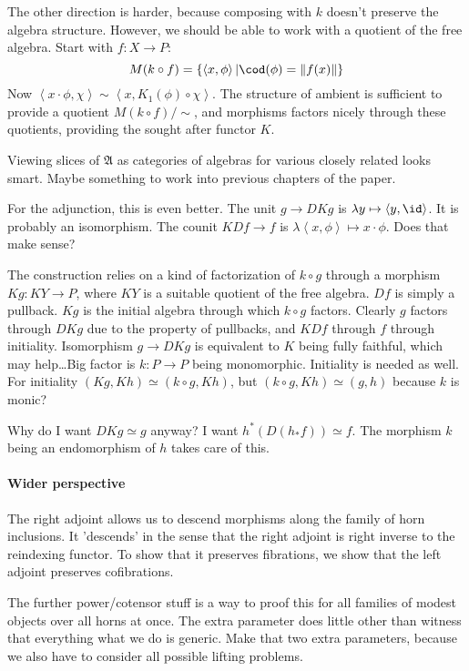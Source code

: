 \documentclass{tac}
\newcommand\set[1]{\left\{#1\right\}}
\newcommand\ri{^*}
\newcommand\of{:}
\newcommand\tuplet[1]{\left\langle #1 \right\rangle}
\newcommand\norm[1]{\Vert #1 \Vert}
\newcommand\ambient{\mathfrak A}
\newcommand\function[2]{\lambda #1 \mapsto #2}
\begin{document}
The other direction is harder, because composing with $k$ doesn't preserve the algebra structure. However, we should be able to work with a quotient of the free algebra. Start with $f\of X\to P$:
\[ M(k\circ f) = \set{\tuplet{x,\phi}|\cod(\phi) = \norm{ f(x) }}\]
Now $\tuplet{x\cdot\phi,\chi} \sim \tuplet{x,K_1(\phi)\circ \chi}$. The structure of ambient is sufficient to provide a quotient $M(k\circ f)/\sim$, and morphisms factors nicely through these quotients, providing the sought after functor $K$.

Viewing slices of $\ambient$ as categories of algebras for various closely related looks smart. Maybe something to work into previous chapters of the paper.

For the adjunction, this is even better. The unit $g \to DKg$ is $\function y \tuplet{y,\id}$. It is probably an isomorphism.
The counit $KDf \to f$ is $\function{\tuplet{x,\phi}} x\cdot\phi$. Does that make sense?

The construction relies on a kind of factorization of $k\circ g$ through a morphism $Kg\of KY \to P$, where $KY$ is a suitable quotient of the free algebra.
$Df$ is simply a pullback. $Kg$ is the initial algebra through which $k\circ g$ factors. Clearly $g$ factors through $DKg$ due to the property of pullbacks, and $KDf$ through $f$ through initiality. Isomorphism $g\to DKg$ is equivalent to $K$ being fully faithful, which may help\dots Big factor is $k\of P\to P$ being monomorphic. Initiality is needed as well. For initiality $(Kg,Kh)\simeq (k\circ g,Kh)$, but $(k\circ g,Kh)\simeq (g,h)$ because $k$ is monic?

Why do I want $DKg\simeq g$ anyway? I want $h\ri(D(h_*f))\simeq f$. The morphism $k$ being an endomorphism of $h$ takes care of this.

\paragraph{Wider perspective}
The right adjoint allows us to descend morphisms along the family of horn inclusions.
It 'descends' in the sense that the right adjoint is right inverse to the reindexing functor.
To show that it preserves fibrations, we show that the left adjoint preserves cofibrations.

The further power/cotensor stuff is a way to proof this for all families of modest objects over all horns at once.
The extra parameter does little other than witness that everything what we do is generic. Make that two extra parameters,
because we also have to consider all possible lifting problems.
\end{document}
